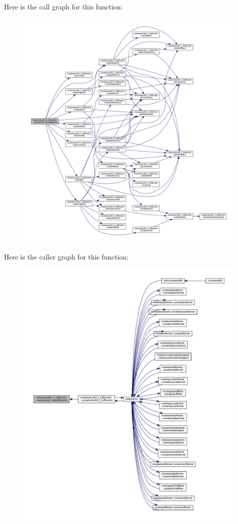 Here is the call graph for this function\+:\nopagebreak
\begin{figure}[H]
\begin{center}
\leavevmode
\includegraphics[width=350pt]{namespacemodulenetcdfcf__2__hdf5mohid_a3998ea5c718e38c4e1c63dcb93c8fdac_cgraph}
\end{center}
\end{figure}
Here is the caller graph for this function\+:\nopagebreak
\begin{figure}[H]
\begin{center}
\leavevmode
\includegraphics[width=350pt]{namespacemodulenetcdfcf__2__hdf5mohid_a3998ea5c718e38c4e1c63dcb93c8fdac_icgraph}
\end{center}
\end{figure}
